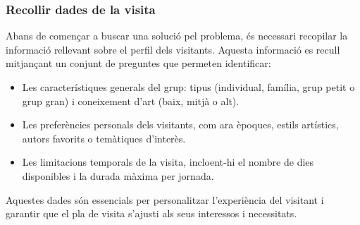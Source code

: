 \documentclass[a4paper]{article}
\begin{document}
	\subsubsection{Recollir dades de la visita}
	
	Abans de començar a buscar una solució pel problema, és necessari recopilar la informació rellevant sobre el perfil dels visitants. Aquesta informació es recull mitjançant un conjunt de preguntes que permeten identificar:
	\begin{itemize}
		\item Les característiques generals del grup: tipus (individual, família, grup petit o grup gran) i coneixement d’art (baix, mitjà o alt).
		\item Les preferències personals dels visitants, com ara èpoques, estils artístics, autors favorits o temàtiques d’interès.
		\item Les limitacions temporals de la visita, incloent-hi el nombre de dies disponibles i la durada màxima per jornada.
	\end{itemize}
	
	Aquestes dades són essencials per personalitzar l’experiència del visitant i garantir que el pla de visita s’ajusti als seus interessos i necessitats.
	
\end{document}

